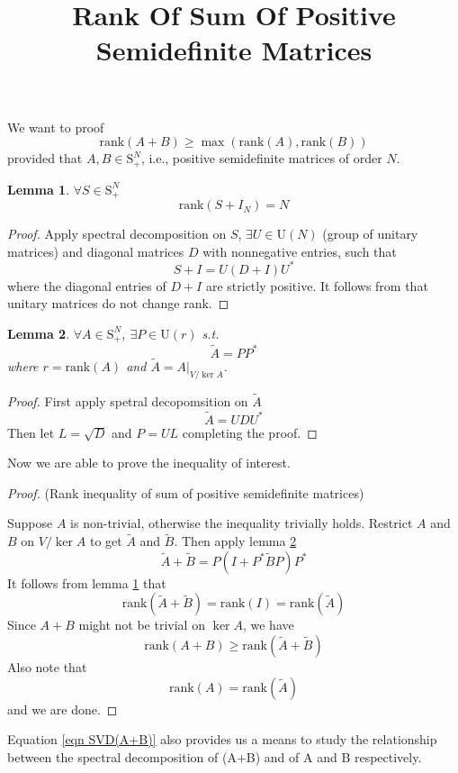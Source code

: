\documentclass[12pt]{article}
\title{Rank Of Sum Of Positive Semidefinite Matrices}
\newtheorem{lemma}{Lemma}
\begin{document}
	\maketitle
	We want to proof 
	\begin{equation}
		\mbox{rank}(A+B)\geq\max(\mbox{rank}(A),\mbox{rank}(B)) \label{r(A+B)>=rA+rB}
	\end{equation}
	provided that $A,B\in \mbox{S}_+^N$, i.e., positive semidefinite matrices of order $N$.

\begin{lemma}\label{lemma rank(S+I)=N}
	$\forall S\in\mbox{S}_+^N$
	\begin{equation*}
		\mbox{rank}(S+I_N)=N
	\end{equation*}
\end{lemma}
\begin{proof}
	Apply spectral decomposition on $S$, $\exists U\in \mbox{U}(N)$ (group of unitary matrices) and diagonal matrices $D$ with nonnegative entries, such that
	$$
	S+I=U(D+I)U^*
	$$
	where the diagonal entries of $D+I$ are strictly positive. It follows from that unitary matrices do not change rank.
\end{proof}
\begin{lemma}\label{lemma A=PP*}
	$\forall A\in\mbox{S}_+^N$, $\exists P\in\mbox{U}(r)$ s.t. 
	$$
	\tilde{A}=PP^*
	$$
	where $r=\mbox{rank}(A)$ and $\tilde{A}=A|_{V/\ker A}$.
\end{lemma}
\begin{proof}
	First apply spetral decopomsition on $\tilde{A}$
	$$ \tilde{A} = UDU^* $$
	Then let $L=\sqrt{D}$ and $P=UL$
	completing the proof.
\end{proof}

Now we are able to prove the inequality of interest.
\begin{proof}
	(Rank inequality of sum of positive semidefinite matrices)
	
	Suppose $A$ is non-trivial, otherwise the inequality trivially holds. Restrict $A$ and $B$ on $V/\ker A$ to get $\tilde{A}$ and $\tilde{B}$. Then apply lemma \ref{lemma A=PP*}
	\begin{equation}
		\tilde{A}+\tilde{B}=P(I+P^*\tilde{B}P)P^*
		\label{eqn SVD(A+B)}
	\end{equation}
	It follows from lemma \ref{lemma rank(S+I)=N} that
	$$\mbox{rank} (\tilde{A}+\tilde{B})=\mbox{rank}(I)=\mbox{rank}(\tilde{A})$$
	Since $A+B$ might not be trivial on $\ker A$, we have
	$$\mbox{rank}(A+B)\geq \mbox{rank}(\tilde{A}+\tilde{B})$$
	Also note that
	$$\mbox{rank}(A)= \mbox{rank}(\tilde{A})$$
	and we are done.
\end{proof}
Equation \ref{eqn SVD(A+B)} also provides us a means to study the relationship between the spectral decomposition of (A+B) and of A and B respectively.
\end{document}
